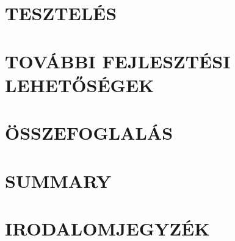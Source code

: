 \documentclass[12pt,a4paper]{article}
\begin{document}
\clearpage
\section{TESZTELÉS}
\label{sec:testing}


\clearpage
\section{TOVÁBBI FEJLESZTÉSI LEHETŐSÉGEK}


\clearpage
\section{ÖSSZEFOGLALÁS}


\clearpage
\section{SUMMARY}




\clearpage
\section{IRODALOMJEGYZÉK}
\printbibliography[heading=none]

\clearpage
\renewcommand{\listfigurename}{ÁBRAJEGYZÉK}
\listoffigures

\clearpage
\renewcommand{\listtablename}{TÁBLAJEGYZÉK}
\listoftables

\clearpage
\renewcommand{\lstlistlistingname}{FORRÁSKÓDJEGYZÉK}
\lstlistoflistings


\end{document}
